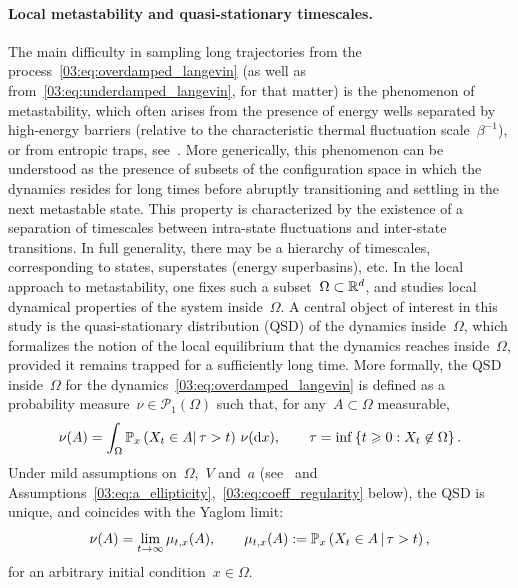     \paragraph{Local metastability and quasi-stationary timescales.}
    The main difficulty in sampling long trajectories from the process~\eqref{03:eq:overdamped_langevin} (as well as from~\eqref{03:eq:underdamped_langevin}, for that matter) is the phenomenon of metastability, which often arises from the presence of energy wells separated by high-energy barriers (relative to the characteristic thermal fluctuation scale~$\beta^{-1}$), or from entropic traps, see~\cite[Section 1.2.3]{LS16}.
    More generically, this phenomenon can be understood as the presence of subsets of the configuration space in which the dynamics resides for long times before abruptly transitioning and settling in the next metastable state.
    This property is characterized by the    existence of a separation of timescales between intra-state fluctuations and inter-state transitions. In full generality, there may be a hierarchy of timescales, corresponding to states, superstates (energy superbasins), etc.
    In the local approach to metastability, one fixes such a subset~$\Omega\subset\mathbb{R}^d$, and studies local dynamical properties of the system inside~$\Omega$.
    A central object of interest in this study is the quasi-stationary distribution (QSD) of the dynamics inside~$\Omega$, which formalizes the notion of the local equilibrium that the dynamics reaches inside~$\Omega$, provided it remains trapped for a sufficiently long time.
    More formally, the QSD inside~$\Omega$ for the dynamics~\eqref{03:eq:overdamped_langevin} is defined as a probability measure~$\nu \in \mathcal P_1(\Omega)$ such that, for any~$A\subset \Omega$ measurable,
    \begin{equation}
        \label{03:eq:qsd}
        \nu(A) = \int_\Omega \mathbb P_x\left(X_t\in A\middle|\,\tau>t\right)\, \nu(\d x),\qquad \tau = \inf\left\{t\geq 0: X_t\not\in \Omega\right\}.
    \end{equation}
    Under mild assumptions on~$\Omega$,~$V$ and~$a$ (see~\cite{LBLLP12} and Assumptions~\eqref{03:eq:a_ellipticity},~\eqref{03:eq:coeff_regularity} below), the QSD is unique, and coincides with the Yaglom limit:
    \begin{equation}
        \label{03:eq:yaglom_limit}
        \nu(A) =\underset{t\to\infty}{\lim}\,\mu_{t,x}(A),\qquad \mu_{t,x}(A) := \P_x\left(X_t\in A\,\middle|\,\tau >t\right),
    \end{equation}
    for an arbitrary initial condition~$x\in \Omega$.

